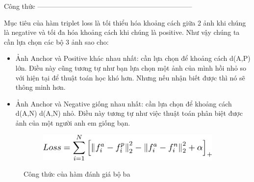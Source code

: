 Công thức --------------------------------------------------------------------

Mục tiêu của hàm triplet loss là tối thiểu hóa khoảng cách giữa 2 ảnh khi chúng là
negative và tối đa hóa khoảng cách khi chúng là positive.
Như vậy chúng ta cần lựa chọn các bộ 3 ảnh sao cho: 
\begin{itemize}
    \item Ảnh Anchor và Positive khác nhau nhất: cần lựa chọn để khoảng cách d(A,P) lớn.
          Điều này cũng tương tự như bạn lựa chọn một ảnh của mình hồi nhỏ so với hiện tại để
          thuật toán học khó hơn. Nhưng nếu nhận biết được thì nó sẽ thông minh hơn.
    \item Ảnh Anchor và Negative giống nhau nhất: cần lựa chọn để khoảng cách d(A,N)
          d(A,N) nhỏ. Điều này tương tự như việc thuật toán phân biệt được ảnh của một người
          anh em giống bạn.
\end{itemize}

\begin{figure}
    \begin{subfigure}{0.8\textwidth}
        \begin{center}
            \includegraphics[width=1.\linewidth]{Chapters/items/fomura.png}
        \end{center}
        \label{fig: fomura}
    \end{subfigure}
    \caption{Công thức của hàm đánh giá bộ ba}
\end{figure}


